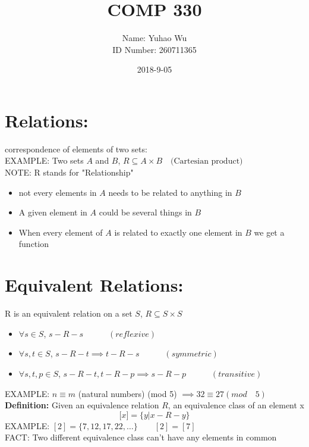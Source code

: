 \documentclass [9 pt]{article}
\theoremstyle{definition}
\begin{document}
\title{COMP 330}
\date{2018-9-05}
\author{Name: Yuhao Wu\\
ID Number: 260711365
}
\maketitle

\section*{Relations:}
correspondence of elements of two sets:\\
EXAMPLE: Two sets $A$ and $B$, $R \subseteq A \times B \quad \text{(Cartesian product)}$ \\
NOTE: R stands for "Relationship"

\begin{itemize}
	\item not every elements in $A$ needs to be related to anything in $B$
	\item A given element in $A$ could be several things in $B$
	\item When every element of $A$ is related to exactly one element in $B$ we get a function
\end{itemize}

\section*{Equivalent Relations:}
R is an equivalent relation on a set $S$, $R \subseteq S\times S $
\begin{itemize}
	\item $\forall s \in S$, $s-R-s\quad \quad \quad (reflexive)$ 
	\item $\forall s, t \in S$, $s-R-t \implies t-R-s\quad \quad \quad (symmetric)$
	\item $\forall s, t, p \in S$, $ s-R-t, t-R-p \implies s-R-p \quad \quad \quad (transitive) $
\end{itemize}
EXAMPLE: $ n \equiv m  $ (natural numbers) (mod 5) $\implies 32 \equiv 27 (mod \quad 5)$\\
\newline
\textbf{Definition:} Given an equivalence relation $R$, an equivalence class of an element x\\
$$\bigg[x\bigg] = \bigg\{ y | x-R-y \bigg\} $$
EXAMPLE: $[2] = \{ 7, 12, 17, 22, \ldots \} \quad \quad [2] = [7] $\\
FACT: Two different equivalence class can't have any elements in common
\end{document}
